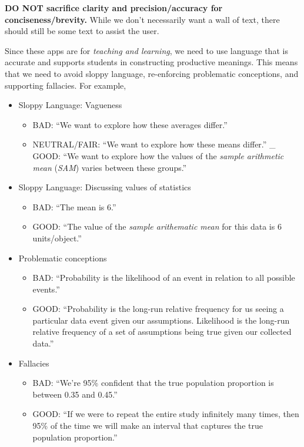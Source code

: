 \documentclass[
]{book}
\providecommand{\tightlist}{%
  \setlength{\itemsep}{0pt}\setlength{\parskip}{0pt}}
\begin{document}
\textbf{DO NOT sacrifice clarity and precision/accuracy for
conciseness/brevity.} While we don't necessarily want a wall of text, there should still be some text to assist the user.

Since these apps are for \emph{teaching and learning}, we need to use language that is accurate and supports students in constructing productive meanings. This means that we need to avoid sloppy language, re-enforcing problematic conceptions, and supporting fallacies. For example,

\begin{itemize}
\tightlist
\item
  Sloppy Language: Vagueness

  \begin{itemize}
  \tightlist
  \item
    BAD: ``We want to explore how these averages differ.''
  \item
    NEUTRAL/FAIR: ``We want to explore how these means differ.''
    \_ GOOD: ``We want to explore how the values of the \emph{sample arithmetic mean} (\emph{SAM}) varies between these groups.''
  \end{itemize}
\item
  Sloppy Language: Discussing values of statistics

  \begin{itemize}
  \tightlist
  \item
    BAD: ``The mean is 6.''
  \item
    GOOD: ``The value of the \emph{sample arithematic mean} for this data is 6 units/object.''
  \end{itemize}
\item
  Problematic conceptions

  \begin{itemize}
  \tightlist
  \item
    BAD: ``Probability is the likelihood of an event in relation to all possible events.''
  \item
    GOOD: ``Probability is the long-run relative frequency for us seeing a particular data event given our assumptions. Likelihood is the long-run relative frequency of a set of assumptions being true given our collected data.''
  \end{itemize}
\item
  Fallacies

  \begin{itemize}
  \tightlist
  \item
    BAD: ``We're 95\% confident that the true population proportion is between 0.35 and 0.45.''
  \item
    GOOD: ``If we were to repeat the entire study infinitely many times, then 95\% of the time we will make an interval that captures the true population proportion.''
  \end{itemize}
\end{itemize}
\end{document}

